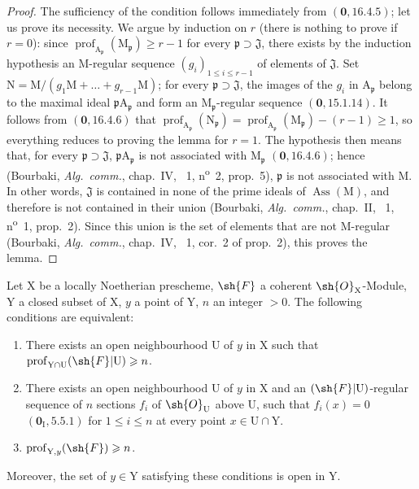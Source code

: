 \begin{proof}
The sufficiency of the condition follows immediately from $(\mathbf{0},16.4.5)$; let us prove its necessity. We argue by induction on $r$ (there is nothing to prove if $r=0$): since $\operatorname{prof}_{\mathrm{A}_\mathfrak{p}}(\mathrm{M}_\mathfrak{p})\geqslant r-1$ for every $\mathfrak{p}\supset\mathfrak{J}$, there exists by the induction hypothesis an M-regular sequence $(g_i)_{1\leqslant i\leqslant r-1}$ of elements of $\mathfrak{J}$. Set $\mathrm{N}=\mathrm{M}/(g_1\mathrm{M}+\ldots+g_{r-1}\mathrm{M})$; for every $\mathfrak{p}\supset\mathfrak{J}$, the images of the $g_i$ in $\mathrm{A}_\mathfrak{p}$ belong to the maximal ideal $\mathfrak{p}\mathrm{A}_\mathfrak{p}$ and form an $\mathrm{M}_\mathfrak{p}$-regular sequence $(\mathbf{0},15.1.14)$. It follows from $(\mathbf{0},16.4.6)$ that $\operatorname{prof}_{\mathrm{A}_\mathfrak{p}}(\mathrm{N}_\mathfrak{p})=\operatorname{prof}_{\mathrm{A}_\mathfrak{p}}(\mathrm{M}_\mathfrak{p})-(r-1)\geqslant 1$, so everything reduces to proving the lemma for $r=1$. The hypothesis then means that, for every $\mathfrak{p}\supset\mathfrak{J}$, $\mathfrak{p}\mathrm{A}_\mathfrak{p}$ is not associated with $\mathrm{M}_\mathfrak{p}$ $(\mathbf{0},16.4.6)$; hence (Bourbaki, \emph{Alg.~comm.}, chap.~IV, \textsection~1, n\textsuperscript{o}~2, prop.~5), $\mathfrak{p}$ is not associated with $\mathrm{M}$. In other words, $\mathfrak{J}$ is contained in none of the prime ideals of $\operatorname{Ass}(\mathrm{M})$, and therefore is not contained in their union (Bourbaki, \emph{Alg.~comm.}, chap.~II, \textsection~1, n\textsuperscript{o}~1, prop.~2). Since this union is the set of elements that are not M-regular (Bourbaki, \emph{Alg.~comm.}, chap.~IV, \textsection~1, cor.~2 of prop.~2), this proves the lemma.
\end{proof}

\begin{proposition}[19.9.3]
\label{IV.19.9.3}
Let $\mathrm{X}$ be a locally Noetherian prescheme, $\sh{F}$ a coherent $\sh{O}_\mathrm{X}$-Module, $\mathrm{Y}$ a closed subset of $\mathrm{X}$, $y$ a point of $\mathrm{Y}$, $n$ an integer $>0$. The following conditions are equivalent:
\begin{enumerate}
\item[\rm a)] There exists an open neighbourhood $\mathrm{U}$ of $y$ in $\mathrm{X}$ such that $\operatorname{prof}_{\mathrm{Y}\cap\mathrm{U}}(\sh{F}|\mathrm{U})\geqslant n$.
\item[\rm b)] There exists an open neighbourhood $\mathrm{U}$ of $y$ in $\mathrm{X}$ and an $(\sh{F}|\mathrm{U})$-regular sequence of $n$ sections $f_i$ of $\sh{O}_\mathrm{U}$ above $\mathrm{U}$, such that $f_i(x)=0$ $(\mathbf{0}_\mathrm{I},5.5.1)$ for $1\leqslant i\leqslant n$ at every point $x\in\mathrm{U}\cap\mathrm{Y}$.
\item[\rm c)] $\operatorname{prof}_{\mathrm{Y},y}(\sh{F})\geqslant n$.
\end{enumerate}

Moreover, the set of $y\in\mathrm{Y}$ satisfying these conditions is open in $\mathrm{Y}$.
\end{proposition}

